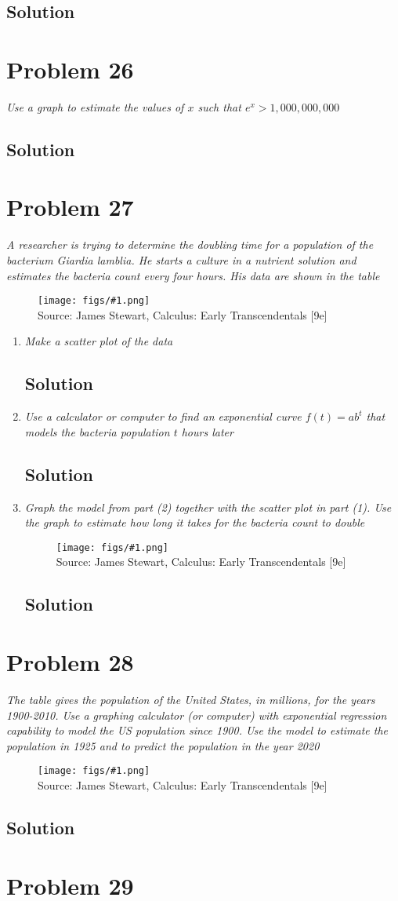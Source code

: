 \documentclass[11pt]{article}
\newcommand{\soln}{\subsection*}
\newcommand{\qn}{\textit}
\newcommand{\imagesource}[1]{{\footnotesize Source: #1}}
\newcommand{\imgqn}[1]{
	\begin{figure}[H]
		\centering
		\texttt{[image: figs/\#1.png]}\\
		\imagesource{James Stewart, Calculus: Early Transcendentals [9e]}
	\end{figure}
}
\begin{document}
\soln{Solution}

\section*{Problem 26}

\qn{Use a graph to estimate the values of $x$ such that $e^x > 1,000,000,000$}

\soln{Solution}

\section*{Problem 27}

\qn{A researcher is trying to determine the doubling time for a population of the bacterium \textit{Giardia lamblia}. He starts a culture in a nutrient solution and estimates the bacteria count every four hours. His data are shown in the table}
\imgqn{1.4.27}

\begin{enumerate}
	\item \qn{Make a scatter plot of the data}
	\soln{Solution}
	
	\item \qn{Use a calculator or computer to find an exponential curve $f(t)=ab^t$ that models the bacteria population $t$ hours later}
	\soln{Solution}
	
	\item \qn{Graph the model from part (2) together with the scatter plot in part (1). Use the graph to estimate how long it takes for the bacteria count to double}
	\imgqn{1.4.27.c}
	\soln{Solution}
\end{enumerate}

\section*{Problem 28}

\qn{The table gives the population of the United States, in millions, for the years 1900-2010. Use a graphing calculator (or computer) with exponential regression capability to model the US population since 1900. Use the model to estimate the population in 1925 and to predict the population in the year 2020}
\imgqn{1.4.28}

\soln{Solution}

\section*{Problem 29}
\end{document}
